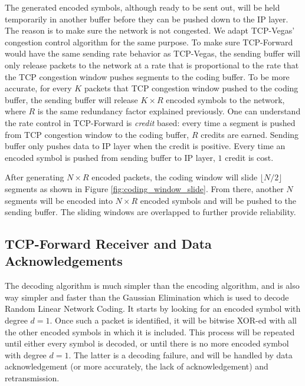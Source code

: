 \documentclass[10pt, conference, final, letterpaper]{IEEEtran}
\theoremstyle{definition}
\begin{document}
The generated encoded symbols, although ready to be sent out, will be held temporarily in another buffer before they can be pushed down to the IP layer. The reason is to make sure the network is not congested. We adapt TCP-Vegas' congestion control algorithm for the same purpose. To make sure TCP-Forward would have the same sending rate behavior as TCP-Vegas, the sending buffer will only release packets to the network at a rate that is proportional to the rate that the TCP congestion window pushes segments to the coding buffer. To be more accurate, for every $K$ packets that TCP congestion window pushed to the coding buffer, the sending buffer will release $K \times R$ encoded symbols to the network, where $R$ is the same redundancy factor explained previously. One can understand the rate control in TCP-Forward is \textit{credit} based: every time a segment is pushed from TCP congestion window to the coding buffer, $R$ credits are earned. Sending buffer only pushes data to IP layer when the credit is positive. Every time an encoded symbol is pushed from sending buffer to IP layer, $1$ credit is cost.

After generating $N \times R$ encoded packets, the coding window will slide $\lfloor N/2 \rfloor$ segments as shown in Figure \ref{fig:coding_window_slide}. From there, another $N$ segments will be encoded into $N \times R$ encoded symbols and will be pushed to the sending buffer. The sliding windows are overlapped to further provide reliability.

\subsection{TCP-Forward Receiver and Data Acknowledgements}
\label{section:TCP-Forward:receiver}

The decoding algorithm is much simpler than the encoding algorithm, and is also way simpler and faster than the Gaussian Elimination which is used to decode Random Linear Network Coding. It starts by looking for an encoded symbol with degree $d = 1$. Once such a packet is identified, it will be bitwise XOR-ed with all the other encoded symbols in which it is included. This process will be repeated until either every symbol is decoded, or until there is no more encoded symbol with degree $d = 1$. The latter is a decoding failure, and will be handled by data acknowledgement (or more accurately, the lack of acknowledgement) and retransmission. 
\end{document}
